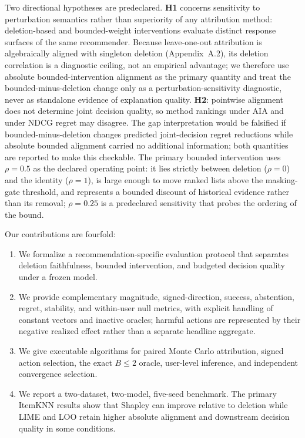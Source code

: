 \documentclass[pdflatex,sn-mathphys-num]{sn-jnl}
\theoremstyle{thmstyleone}
\theoremstyle{thmstyletwo}
\theoremstyle{thmstylethree}
\begin{document}
Two directional hypotheses are predeclared. \textbf{H1} concerns sensitivity to perturbation semantics rather than superiority of any attribution method: deletion-based and bounded-weight interventions evaluate distinct response surfaces of the same recommender. Because leave-one-out attribution is algebraically aligned with singleton deletion (Appendix~A.2), its deletion correlation is a diagnostic ceiling, not an empirical advantage; we therefore use absolute bounded-intervention alignment as the primary quantity and treat the bounded-minus-deletion change only as a perturbation-sensitivity diagnostic, never as standalone evidence of explanation quality. \textbf{H2}: pointwise alignment does not determine joint decision quality, so method rankings under AIA and under NDCG regret may disagree. The gap interpretation would be falsified if bounded-minus-deletion changes predicted joint-decision regret reductions while absolute bounded alignment carried no additional information; both quantities are reported to make this checkable. The primary bounded intervention uses $\rho=0.5$ as the declared operating point: it lies strictly between deletion ($\rho=0$) and the identity ($\rho=1$), is large enough to move ranked lists above the masking-gate threshold, and represents a bounded discount of historical evidence rather than its removal; $\rho=0.25$ is a predeclared sensitivity that probes the ordering of the bound.

Our contributions are fourfold:
\begin{enumerate}
  \item We formalize a recommendation-specific evaluation protocol that separates deletion faithfulness, bounded intervention, and budgeted decision quality under a frozen model.
  \item We provide complementary magnitude, signed-direction, success, abstention, regret, stability, and within-user null metrics, with explicit handling of constant vectors and inactive oracles; harmful actions are represented by their negative realized effect rather than a separate headline aggregate.
  \item We give executable algorithms for paired Monte Carlo attribution, signed action selection, the exact $B\le2$ oracle, user-level inference, and independent convergence selection.
  \item We report a two-dataset, two-model, five-seed benchmark. The primary ItemKNN results show that Shapley can improve relative to deletion while LIME and LOO retain higher absolute alignment and downstream decision quality in some conditions.
\end{enumerate}
\end{document}
